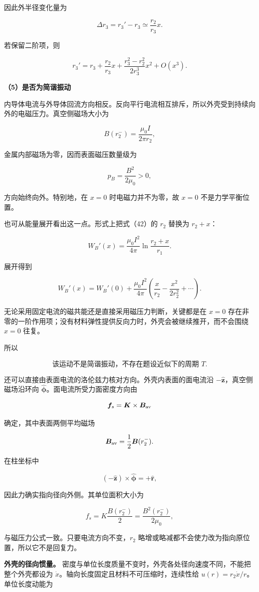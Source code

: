 \documentclass[12pt,a4paper,UTF8]{ctexart}
\begin{document}
因此外半径变化量为

\[\boxed{\Delta r_3=r_3'-r_3\simeq\frac{r_2}{r_3}x}. \tag{44}\]

若保留二阶项，则

\[r_3'=r_3+\frac{r_2}{r_3}x
+\frac{r_3^2-r_2^2}{2r_3^3}x^2+O(x^3). \tag{45}\]

\textbf{（5）是否为简谐振动}

内导体电流与外导体回流方向相反。反向平行电流相互排斥，所以外壳受到持续向外的电磁压力。真空侧磁场大小为

\[B(r_2^-)=\frac{\mu_0I}{2\pi r_2},\]

金属内部磁场为零，因而表面磁压数量级为

\[p_B=\frac{B^2}{2\mu_0}>0,\]

方向始终向外。特别地，在 \(x=0\) 时电磁力并不为零，故 \(x=0\)
不是力学平衡位置。

也可从能量展开看出这一点。形式上把式（42）的 \(r_2\) 替换为 \(r_2+x\)：

\[W_B'(x)=\frac{\mu_0I^2}{4\pi}
\ln\frac{r_2+x}{r_1}.\]

展开得到

\[W_B'(x)=W_B'(0)+\frac{\mu_0I^2}{4\pi}
\left(\frac{x}{r_2}-\frac{x^2}{2r_2^2}+\cdots\right). \tag{46}\]

无论采用固定电流的磁共能还是直接采用磁压力判断，关键都是在 \(x=0\)
存在非零的一阶作用项；没有材料弹性提供反向力时，外壳会被继续推开，而不会围绕
\(x=0\) 往复。

所以

\[\boxed{\text{该运动不是简谐振动，不存在题设近似下的周期 }T}. \tag{47}\]

还可以直接由表面电流的洛伦兹力核对方向。外壳内表面的面电流沿
\(-\hat{\bm z}\)，真空侧磁场沿环向
\(\hat{\bm\phi}\)。面电流所受力面密度方向由

\[\bm f_s=\bm K\times\bm B_{\rm av}\]

确定，其中表面两侧平均磁场

\[\bm B_{\rm av}=\frac12\bm B(r_2^-).\]

在柱坐标中

\[(-\hat{\bm z})\times\hat{\bm\phi}=+\hat{\bm r},\]

因此力确实指向径向外侧。其单位面积大小为

\[f_s=K\frac{B(r_2^-)}2
=\frac{B^2(r_2^-)}{2\mu_0},\]

与磁压力公式一致。只要电流方向不变，\(r_2\)
略增或略减都不会使力改为指向原位置，所以它不是回复力。

\textbf{外壳的径向惯量。}
密度与单位长度质量不变时，外壳各处径向速度不同，不能把整个外壳都设为
\(\dot x\)。轴向长度固定且材料不可压缩时，连续性给
\(u(r)=r_2\dot x/r\)。单位长度动能为
\end{document}
